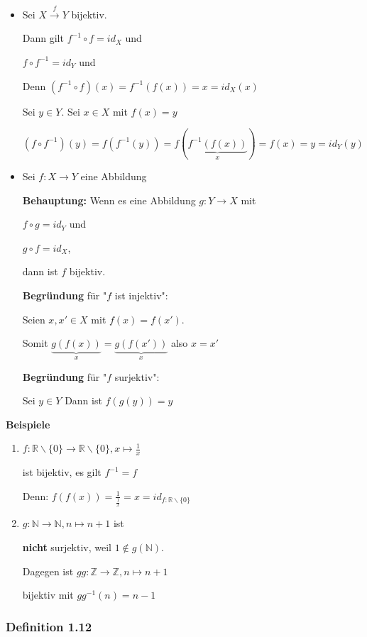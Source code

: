 \documentclass{scrartcl}
\begin{document}
\begin{itemize}

\item Sei $X \stackrel{f}{\to}Y$ bijektiv.

Dann gilt $f^{-1} \circ f = id_X$ und

$f \circ f^{-1} = id_Y$ und

Denn $(f^{-1} \circ f )(x)=f^{-1}(f(x))=x=id_X(x)$

Sei $y \in Y$. Sei $x \in X$ mit $f(x)=y$

$(f \circ f^{-1})(y)=f(f^{-1}(y))=f(\underbrace{f^{-1}(f(x))}_{x})=f(x)=y=id_Y(y)$

\item Sei $f: X \to Y$ eine Abbildung

\textbf{Behauptung:} Wenn es eine Abbildung $g:Y \to X$ mit

$f \circ g = id_Y$ und

$g \circ f = id_X$,

dann ist $f$ bijektiv.

\textbf{Begründung} für "$f$ ist injektiv":

Seien $x,x' \in X$ mit $f(x)=f(x')$.

Somit $\underbrace{g(f(x))}_{x}=\underbrace{g(f(x'))}_{x}$ also $x=x'$

\textbf{Begründung} für "$f$ surjektiv": 

Sei $y \in Y$ Dann ist $f(g(y))=y$

\end{itemize}

\textbf{Beispiele}

\begin{enumerate}
  \item $f:\mathbb{R} \backslash \{0\} \to \mathbb{R} \backslash \{0\}, x\mapsto \frac{1}{x}$

ist bijektiv, es gilt $f^{-1}=f$

Denn: $f(f(x))=\frac{1}{\frac{1}{x}}=x=id_{f:\mathbb{R} \backslash \{0\}}$  
  
  \item $g:\mathbb{N} \to \mathbb{N}, n \mapsto n+1$ ist 
  
  
  \textbf{nicht} surjektiv, weil $1 \notin g(\mathbb{N})$.
  
  Dagegen ist $gg: \mathbb{Z} \to \mathbb{Z}, n \mapsto n+1$
  
  bijektiv mit $gg^{-1}(n)=n-1$ 
\end{enumerate}

\subsubsection{Definition 1.12}
\end{document}
